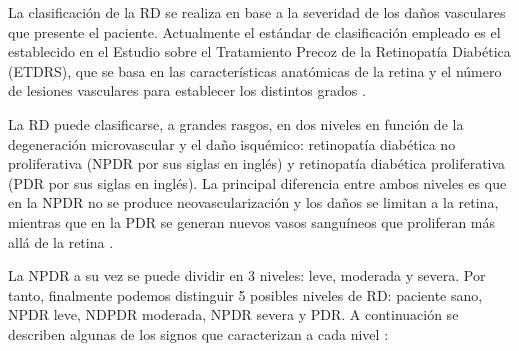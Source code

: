 La clasificación de la RD se realiza en base a la severidad de los daños vasculares que presente el paciente. Actualmente el estándar de clasificación empleado es el establecido en el Estudio sobre el Tratamiento Precoz de la Retinopatía Diabética (ETDRS), que se basa en las características anatómicas de la retina y el número de lesiones vasculares para establecer los distintos grados \cite{retino:etdrs, retinopatia:Retinal_and_eye}. 

La RD puede clasificarse, a grandes rasgos, en dos niveles en función de la degeneración microvascular y el daño isquémico: retinopatía diabética no proliferativa (NPDR por sus siglas en inglés) y retinopatía diabética proliferativa (PDR por sus siglas en inglés). La principal diferencia entre ambos niveles es que en la NPDR no se produce neovascularización y los daños se limitan a la retina, mientras que en la PDR se generan nuevos vasos sanguíneos que proliferan más allá de la retina \cite{retinopatia:chile,retinopatia:cheung}. 

La NPDR a su vez se puede dividir en 3 niveles: leve, moderada y severa. Por tanto, finalmente podemos distinguir 5 posibles niveles de RD: paciente sano, NPDR leve, NDPDR moderada, NPDR severa y PDR. A continuación se describen algunas de los signos que caracterizan a cada nivel \cite{retinopatia:cheung, retino:OMS}:

